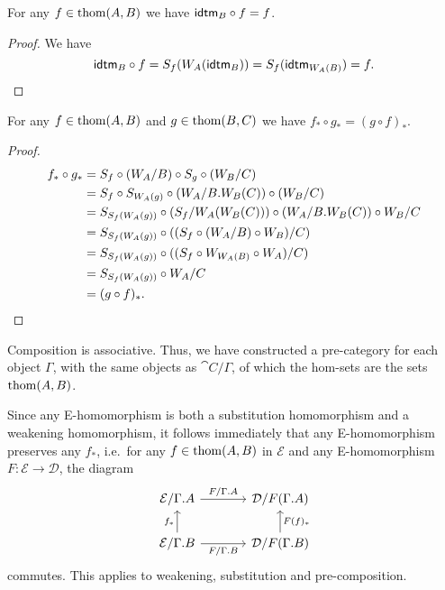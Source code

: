 \begin{lem}
For any $f\in\mathrm{thom}(A,B)$ we have $\tfid{B}\circ f=f$.
\end{lem}

\begin{proof}
We have
\begin{equation*}
\tfid{B}\circ f=S_f(W_A(\tfid{B}))=S_f(\tfid{W_A(B)})=f.\qedhere
\end{equation*}
\end{proof}

\begin{lem}
For any $f\in\mathrm{thom}(A,B)$ and $g\in\mathrm{thom}(B,C)$ we have $f_\ast\circ g_\ast=(g\circ f)_\ast$. 
\end{lem}

\begin{proof}
\begin{align*}
f_\ast\circ g_\ast & = S_f\circ (W_A/B) \circ S_g \circ (W_B/C)\\
& = S_f\circ S_{W_A(g)}\circ(W_A/\ctxext{B}{W_B(C)})\circ (W_B/C) \\
& = S_{S_f(W_A(g))}\circ (S_f/W_A(W_B(C)))\circ (W_A/\ctxext{B}{W_B(C)}) \circ W_B/C \\
& = S_{S_f(W_A(g))}\circ ((S_f\circ (W_A/B) \circ W_B)/C) \\
& = S_{S_f(W_A(g))}\circ ((S_f\circ W_{W_A(B)}\circ W_A)/C) \\
& = S_{S_f(W_A(g))}\circ W_A/C \\
& = (g\circ f)_\ast.\qedhere
\end{align*}
\end{proof}

\begin{cor}
Composition is associative. Thus, we have constructed a pre-category for each
object $\Gamma$, with the same objects as $\cat{C}/\Gamma$, of which the hom-sets
are the sets $\mathrm{thom}(A,B)$. 
\end{cor}

\begin{rmk}
Since any E-homomorphism is both a substitution homomorphism and a weakening
homomorphism, it follows immediately that any E-homomorphism preserves any
$f_\ast$, i.e.~for any $f\in\mathrm{thom}(A,B)$ in $\mathcal{E}$ and any E-homomorphism
$F:\mathcal{E}\to\mathcal{D}$, the diagram
\begin{equation*}
\begin{tikzcd}[column sep=large]
\mathcal{E}/\ctxext{\Gamma}{A} \arrow[r,"F/\ctxext{\Gamma}{A}"] & \mathcal{D}/F(\ctxext{\Gamma}{A})
  \\
\mathcal{E}/\ctxext{\Gamma}{B} \arrow[u,"f_\ast"] \arrow[r,swap,"F/\ctxext{\Gamma}{B}"] & \mathcal{D}/F(\ctxext{\Gamma}{B}) \arrow[u,swap,"F(f)_\ast"]
\end{tikzcd}
\end{equation*}
commutes. This applies to weakening, substitution and pre-composition.
\end{rmk}

